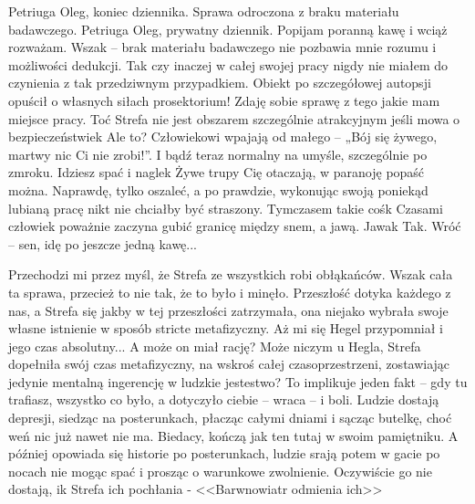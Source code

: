 \documentclass[../MAIN.tex]{subfiles}
\begin{document}
Petriuga Oleg, koniec dziennika. Sprawa odroczona z braku materiału badawczego.
% 
% 
% 
Petriuga Oleg, prywatny dziennik. Popijam poranną kawę i wciąż rozważam. Wszak -- brak materiału badawczego nie pozbawia mnie rozumu i możliwości dedukcji. Tak czy inaczej w całej swojej pracy nigdy nie miałem do czynienia z tak przedziwnym przypadkiem. Obiekt po szczegółowej autopsji opuścił o własnych siłach prosektorium! Zdaję sobie sprawę z tego jakie mam miejsce pracy. Toć Strefa nie jest obszarem szczególnie atrakcyjnym jeśli mowa o bezpieczeństwie\3k Ale to? Człowiekowi wpajają od małego -- „Bój się żywego, martwy nic Ci nie zrobi!”. I bądź teraz normalny na umyśle, szczególnie po zmroku. Idziesz spać i nagle\3k Żywe trupy Cię otaczają, w paranoję popaść można. Naprawdę, tylko oszaleć, a po prawdzie, wykonując swoją poniekąd lubianą pracę nikt nie chciałby być straszony. Tymczasem takie coś\3k Czasami człowiek poważnie zaczyna gubić granicę między snem, a jawą.
Jawa\3k Tak. Wróć -- sen, idę po jeszcze jedną kawę...

Przechodzi mi przez myśl, że Strefa ze wszystkich robi obłąkańców. Wszak cała ta sprawa, przecież to nie tak, że to było i minęło. Przeszłość dotyka każdego z nas, a Strefa się jakby w tej przeszłości zatrzymała, ona niejako wybrała swoje własne istnienie w sposób stricte metafizyczny. Aż mi się Hegel przypomniał i jego czas absolutny... A może on miał rację? Może niczym u Hegla, Strefa dopełniła swój czas metafizyczny, na wskroś całej czasoprzestrzeni, zostawiając jedynie mentalną ingerencję w ludzkie jestestwo? To implikuje jeden fakt -- gdy tu trafiasz, wszystko co było, a dotyczyło ciebie -- wraca -- i boli. Ludzie dostają depresji, siedząc na posterunkach, płacząc całymi dniami i sącząc butelkę, choć weń nic już nawet nie ma. Biedacy, kończą jak ten tutaj w swoim pamiętniku. A później opowiada się historie po posterunkach, ludzie srają potem w gacie po nocach nie mogąc spać i prosząc o warunkowe zwolnienie. Oczywiście go nie dostają, i\3k Strefa ich pochłania - <<Barwnowiatr odmienia ich>>
\end{document}
